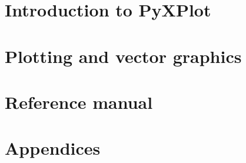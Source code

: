 \makeatletter
\renewcommand\l@chapter[2]{%
  \ifnum \c@tocdepth >\m@ne
    \addpenalty{-\@highpenalty}%
    \vskip 1.0em \@plus\p@
    \setlength\@tempdima{2em}%
    \begingroup
      \parindent \z@ \rightskip \@pnumwidth
      \parfillskip -\@pnumwidth
      \leavevmode \bfseries
      \advance\leftskip\@tempdima
      \hskip -\leftskip
      #1\nobreak\hfil \nobreak\hb@xt@\@pnumwidth{\hss #2}\par
      \penalty\@highpenalty
    \endgroup
  \fi}
\renewcommand\l@section{\@dottedtocline{1}{2.0em}{3.0em}}
\renewcommand\l@subsection{\@dottedtocline{2}{5.0em}{4.0em}}
\makeatother
\tableofcontents

\listoffigures
{}

\newpage
{}

\part{Introduction to PyXPlot}






\part{Plotting and vector graphics}



\part{Reference manual}








\part{Appendices}
\appendix





\printindex


